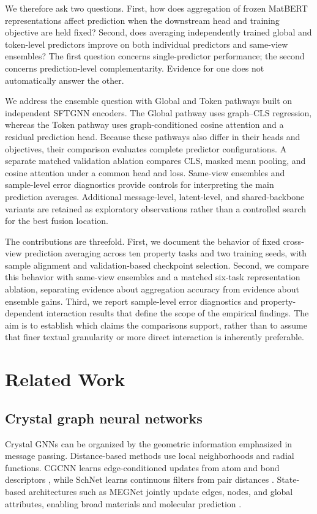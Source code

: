 \documentclass[a4paper,fleqn]{cas-sc}
\begin{document}
We therefore ask two questions. First, how does aggregation of frozen MatBERT representations affect prediction when the downstream head and training objective are held fixed? Second, does averaging independently trained global and token-level predictors improve on both individual predictors and same-view ensembles? The first question concerns single-predictor performance; the second concerns prediction-level complementarity. Evidence for one does not automatically answer the other.

We address the ensemble question with Global and Token pathways built on independent SFTGNN encoders. The Global pathway uses graph--CLS regression, whereas the Token pathway uses graph-conditioned cosine attention and a residual prediction head. Because these pathways also differ in their heads and objectives, their comparison evaluates complete predictor configurations. A separate matched validation ablation compares CLS, masked mean pooling, and cosine attention under a common head and loss. Same-view ensembles and sample-level error diagnostics provide controls for interpreting the main prediction averages. Additional message-level, latent-level, and shared-backbone variants are retained as exploratory observations rather than a controlled search for the best fusion location.

The contributions are threefold. First, we document the behavior of fixed cross-view prediction averaging across ten property tasks and two training seeds, with sample alignment and validation-based checkpoint selection. Second, we compare this behavior with same-view ensembles and a matched six-task representation ablation, separating evidence about aggregation accuracy from evidence about ensemble gains. Third, we report sample-level error diagnostics and property-dependent interaction results that define the scope of the empirical findings. The aim is to establish which claims the comparisons support, rather than to assume that finer textual granularity or more direct interaction is inherently preferable.

\section{Related Work}
\subsection{Crystal graph neural networks}
Crystal GNNs can be organized by the geometric information emphasized in message passing. Distance-based methods use local neighborhoods and radial functions. CGCNN learns edge-conditioned updates from atom and bond descriptors \citep{xie2018cgcnn}, while SchNet learns continuous filters from pair distances \citep{schutt2018schnet}. State-based architectures such as MEGNet jointly update edges, nodes, and global attributes, enabling broad materials and molecular prediction \citep{chen2019megnet}.
\end{document}
